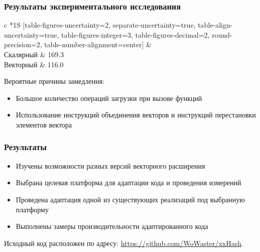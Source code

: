 \documentclass[aspectratio=169]{beamer}
\begin{document}
\begin{frame}
	\frametitle{Результаты экспериментального исследования}
	\begin{table}[h]
		\def\arraystretch{1.1}  %
		\setlength\tabcolsep{0.2em}
		\centering
		\caption{Сравнение производительности хеш-функции  на входных данных размером в 1000~Кб; числа приведены с относительной погрешностью 0.5\%}
		\begin{tabular}[C]{
				c
				*1{S
							[table-figures-uncertainty=2, separate-uncertainty=true, table-align-uncertainty=true,
								table-figures-integer=3, table-figures-decimal=2, round-precision=2,
								table-number-alignment=center]
					}
			}
			\toprule
			 &  \\ \midrule
			Скалярный & 169.3 \\ \midrule
			Векторный & 116.0 \\
			\bottomrule
		\end{tabular}
		\label{tab:speed}
	\end{table}

	Вероятные причины замедления:
	\begin{itemize}
		\item Большое количество операций загрузки при вызове функций
		\item Использование инструкций объединения векторов и инструкций перестановки элементов вектора
	\end{itemize}
\end{frame}

\begin{frame}
	\frametitle{Результаты}
	\begin{itemize}
		\item Изучены возможности разных версий векторного расширения \riscv{}
		\item Выбрана целевая платформа для адаптации кода и проведения измерений
		\item Проведена адаптация одной из существующих реализаций под выбранную платформу
		\item Выполнены замеры производительности адаптированного кода
	\end{itemize}

	Исходный код расположен по адресу: \url{https://github.com/WoWaster/xxHash}.
\end{frame}
\end{document}
